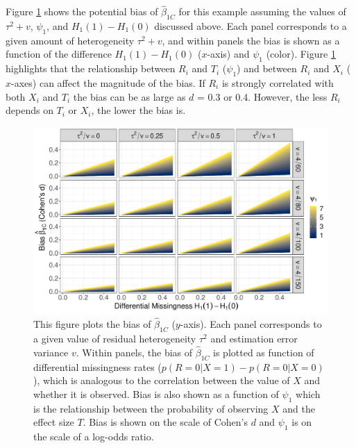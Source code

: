 \documentclass[
]{article}
\begin{document}
Figure \ref{fig:b1} shows the potential bias of \(\hat{\beta}_{1C}\) for this example assuming the values of \(\tau^2 + v\), \(\psi_1\), and \(H_1(1) - H_1(0)\) discussed above.
Each panel corresponds to a given amount of heterogeneity \(\tau^2 + v\), and within panels the bias is shown as a function of the difference \(H_1(1) - H_1(0)\) (\(x\)-axis) and \(\psi_1\) (color).
Figure \ref{fig:b1} highlights that the relationship between \(R_i\) and \(T_i\) (\(\psi_1\)) and between \(R_i\) and \(X_i\) (\(x\)-axes) can affect the magnitude of the bias.
If \(R_i\) is strongly correlated with both \(X_i\) and \(T_i\) the bias can be as large as \(d\) = 0.3 or 0.4.
However, the less \(R_i\) depends on \(T_i\) or \(X_i\), the lower the bias is.

\begin{figure}
\begin{center}
\includegraphics[width = \textwidth]{./graphics/bias_beta1_ex1}
\end{center}
\caption{This figure plots the bias of $\hat{\beta}_{1C}$ ($y$-axis). Each panel corresponds to a given value of residual heterogeneity $\tau^2$ and estimation error variance $v$. Within panels, the bias of $\hat{\beta}_{1C}$ is plotted as function of differential missingness rates ($p(R = 0 | X = 1) - p(R = 0 | X = 0)$), which is analogous to the correlation between the value of $X$ and whether it is observed. Bias is also shown as a function of $\psi_1$ which is the relationship between the probability of observing $X$ and the effect size $T$. Bias is shown on the scale of Cohen's $d$ and $\psi_1$ is on the scale of a log-odds ratio.}
\label{fig:b1}
\end{figure}
\end{document}
